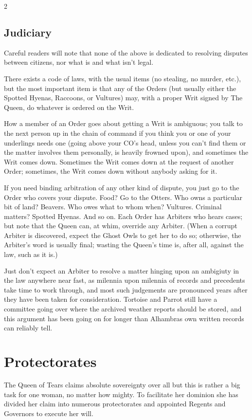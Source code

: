 \begin{multicols}{2}
\subsection*{Judiciary}

Careful readers will note that none of the above is dedicated to resolving disputes between citizens, nor what is and what isn't legal.

There exists a code of laws, with the usual items (no stealing, no murder, etc.), but the most important item is that any of the Orders (but usually either the Spotted Hyenas, Raccoons, or Vultures) may, with a proper Writ signed by The Queen, do whatever is ordered on the Writ.

How a member of an Order goes about getting a Writ is ambiguous; you talk to the next person up in the chain of command if you think you or one of your underlings needs one (going above your CO's head, unless you can't find them or the matter involves them personally, is heavily frowned upon), and sometimes the Writ comes down. Sometimes the Writ comes down at the request of another Order; sometimes, the Writ comes down without anybody asking for it.

If you need binding arbitration of any other kind of dispute, you just go to the Order who covers your dispute. Food? Go to the Otters. Who owns a particular bit of land? Beavers. Who owes what to whom when? Vultures. Criminal matters? Spotted Hyenas. And so on. Each Order has Arbiters who hears cases; but note that the Queen can, at whim, override any Arbiter. (When a corrupt Arbiter is discovered, expect the Ghost Owls to get her to do so; otherwise, the Arbiter's word is usually final; wasting the Queen's time is, after all, against the law, such as it is.)

Just don't expect an Arbiter to resolve a matter hinging upon an ambigiuty in the law anywhere near fast, as milennia upon milennia of records and precedents take time to work through, and most such judgements are pronounced years after they have been taken for consideration. Tortoise and Parrot still have a committee going over where the archived weather reports should be stored, and this argument has been going on for longer than Alhambras own written records can reliably tell. 

\section*{Protectorates}
The Queen of Tears claims absolute sovereignty over all but this is rather a big task for one woman, no matter how mighty. To facilitate her dominion she has divided her claim into numerous protectorates and appointed Regents and Governors to execute her will.


\end{multicols}
